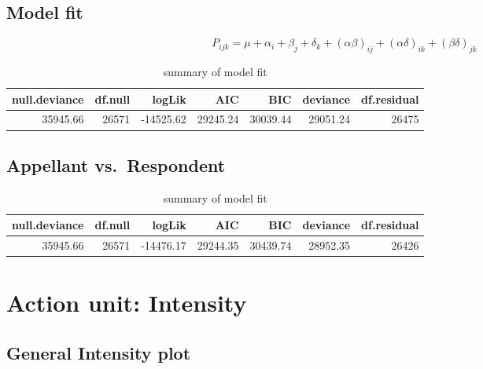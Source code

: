 \documentclass{monashthesis}
\begin{document}
\hypertarget{model-fit-1}{%
\subsection{Model fit}\label{model-fit-1}}

\begin{equation}\label{eq:judge_au_video}
P_{ijk} = \mu + \alpha_i + \beta_j +\delta_k + (\alpha\beta)_{ij}+(\alpha\delta)_{ik} + (\beta\delta)_{jk}
\end{equation}

\begin{table}[t]

\caption{\label{tab:unnamed-chunk-10}\label{tab:glance_2}summary of model fit}
\centering
\begin{tabular}{r|r|r|r|r|r|r}
\hline
null.deviance & df.null & logLik & AIC & BIC & deviance & df.residual\\
\hline
35945.66 & 26571 & -14525.62 & 29245.24 & 30039.44 & 29051.24 & 26475\\
\hline
\end{tabular}
\end{table}

\hypertarget{appellant-vs.respondent}{%
\subsection{Appellant vs.~Respondent}\label{appellant-vs.respondent}}

\begin{table}[t]

\caption{\label{tab:unnamed-chunk-12}\label{tab:glance_3}summary of model fit}
\centering
\begin{tabular}{r|r|r|r|r|r|r}
\hline
null.deviance & df.null & logLik & AIC & BIC & deviance & df.residual\\
\hline
35945.66 & 26571 & -14476.17 & 29244.35 & 30439.74 & 28952.35 & 26426\\
\hline
\end{tabular}
\end{table}

\hypertarget{action-unit-intensity}{%
\section{Action unit: Intensity}\label{action-unit-intensity}}

\hypertarget{general-intensity-plot}{%
\subsection{General Intensity plot}\label{general-intensity-plot}}
\end{document}
